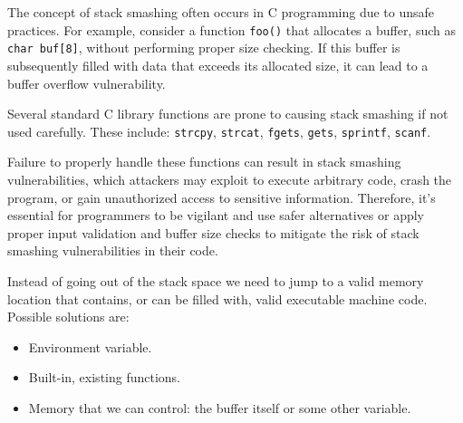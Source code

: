The concept of stack smashing often occurs in C programming due to unsafe practices. 
For example, consider a function \texttt{foo()} that allocates a buffer, such as \texttt{char buf[8]}, without performing proper size checking. 
If this buffer is subsequently filled with data that exceeds its allocated size, it can lead to a buffer overflow vulnerability.

Several standard C library functions are prone to causing stack smashing if not used carefully. 
These include: \texttt{strcpy}, \texttt{strcat}, \texttt{fgets}, \texttt{gets}, \texttt{sprintf}, \texttt{scanf}.

Failure to properly handle these functions can result in stack smashing vulnerabilities, which attackers may exploit to execute arbitrary code, crash the program, or gain unauthorized access to sensitive information. 
Therefore, it's essential for programmers to be vigilant and use safer alternatives or apply proper input validation and buffer size checks to mitigate the risk of stack smashing vulnerabilities in their code.

Instead of going out of the stack space we need to jump to a valid memory
location that contains, or can be filled with,
valid executable machine code. 
Possible solutions are: 
\begin{itemize}
    \item Environment variable.
    \item Built-in, existing functions.
    \item Memory that we can control: the buffer itself or some other variable.
\end{itemize}

